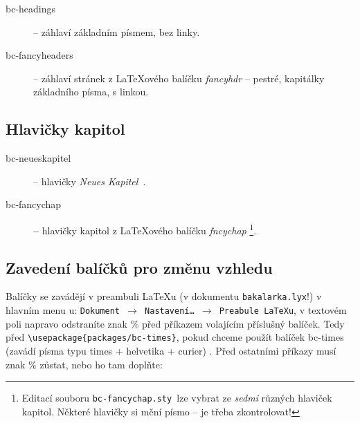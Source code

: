 \begin{description}
\item [{bc-headings}] -- záhlaví základním písmem, bez linky.
\item [{bc-fancyheaders}] -- záhlaví stránek z \LaTeX{}ového balíčku \emph{fancyhdr}
-- pestré, kapitálky základního písma, s linkou.
\end{description}

\subsection{Hlavičky kapitol}

\begin{description}
\item [{bc-neueskapitel}] -- hlavičky \emph{Neues Kapitel}~\cite{NeuesKapitel}.
\item [{bc-fancychap}] \textbf{-- }hlavičky kapitol z \LaTeX{}ového balíčku
\emph{fncychap}%
\footnote{Editací souboru \texttt{bc-fancychap.sty }lze vybrat ze\emph{ sedmi}
různých  hlaviček kapitol. Některé hlavičky si mění písmo -- je třeba
zkontrolovat!%
}. 
\end{description}

\subsection{Zavedení balíčků pro změnu vzhledu\label{sub:Zavedeni}}

Balíčky se zavádějí v preambuli \LaTeX u (v dokumentu \texttt{bakalarka.lyx}!)
v hlavním menu \LyX{}u: \texttt{Dokument $\rightarrow$ Nastavení\ldots{}
$\rightarrow$ Preabule LaTeXu}, v textovém poli napravo odstraníte
znak \% před příkazem volajícím příslušný balíček. Tedy před \texttt{\textbackslash{}usepackage\{packages/bc-times\}},
pokud chceme použít balíček bc-times (zavádí písma typu times + helvetika
+ curier) . Před ostatními příkazy musí znak \% zůstat, nebo ho tam
doplňte:

